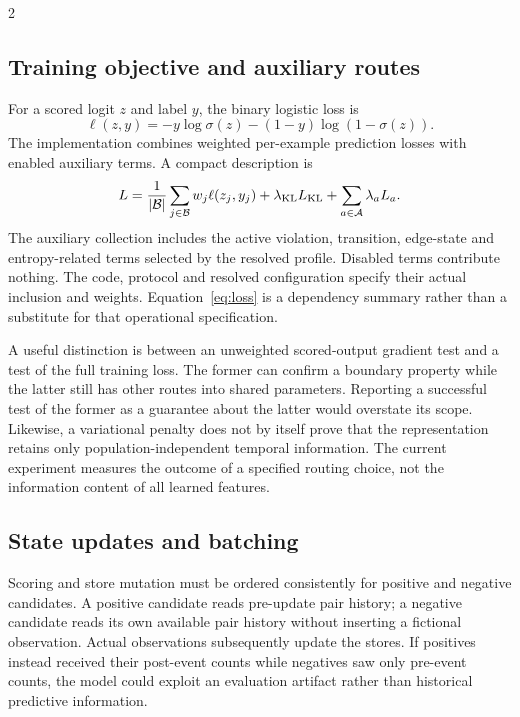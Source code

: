 \documentclass[a4paper,10pt]{article}
\begin{document}
\begin{multicols}{2}
\subsection{Training objective and auxiliary routes}
For a scored logit $z$ and label $y$, the binary logistic loss is
\begin{equation}
\ell(z,y)=-y\log\sigma(z)-(1-y)\log(1-\sigma(z)).
\label{eq:bce}
\end{equation}
The implementation combines weighted per-example prediction losses with enabled auxiliary terms. A compact description is
\begin{equation}
L=\frac{1}{|\mathcal B|}\sum_{j\in\mathcal B}w_j\ell(z_j,y_j)
+\lambda_{\rm KL}L_{\rm KL}+\sum_{a\in\mathcal A}\lambda_aL_a.
\label{eq:loss}
\end{equation}
The auxiliary collection includes the active violation, transition, edge-state and entropy-related terms selected by the resolved profile. Disabled terms contribute nothing. The code, protocol and resolved configuration specify their actual inclusion and weights. Equation~\eqref{eq:loss} is a dependency summary rather than a substitute for that operational specification.

A useful distinction is between an unweighted scored-output gradient test and a test of the full training loss. The former can confirm a boundary property while the latter still has other routes into shared parameters. Reporting a successful test of the former as a guarantee about the latter would overstate its scope. Likewise, a variational penalty does not by itself prove that the representation retains only population-independent temporal information. The current experiment measures the outcome of a specified routing choice, not the information content of all learned features.

\subsection{State updates and batching}
Scoring and store mutation must be ordered consistently for positive and negative candidates. A positive candidate reads pre-update pair history; a negative candidate reads its own available pair history without inserting a fictional observation. Actual observations subsequently update the stores. If positives instead received their post-event counts while negatives saw only pre-event counts, the model could exploit an evaluation artifact rather than historical predictive information.


\end{multicols}
\end{document}
